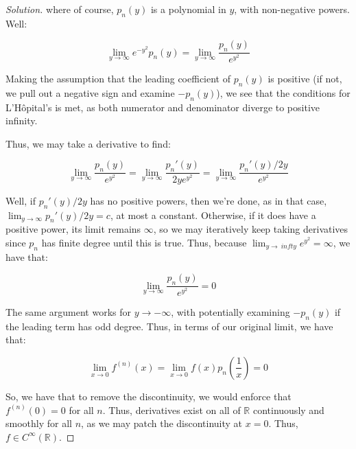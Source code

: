 \documentclass[10pt]{article}
\begin{document}
\begin{proof}[Solution]
where of course, $p_n(y)$ is a polynomial in $y$, with non-negative powers. Well:

$$\lim_{y \to \infty} e^{-y^2} p_n(y)  = \lim_{y \to \infty}\frac{p_n(y)}{e^{y^2}} $$

Making the assumption that the leading coefficient of $p_n(y)$ is positive (if not, we pull out a negative sign and examine $-p_n(y)$), we see that the conditions for L'H\^opital's is met, as both numerator and denominator diverge to positive infinity.

Thus, we may take a derivative to find:

$$  \lim_{y \to \infty}\frac{p_n(y)}{e^{y^2}} =  \lim_{y \to \infty}\frac{p_n'(y)}{2ye^{y^2}} =  \lim_{y \to \infty}\frac{p_n'(y)/2y}{e^{y^2}}$$  


Well, if $p_n'(y)/2y$ has no positive powers, then we're done, as in that case, $\lim_{y \to \infty} p_n'(y)/2y = c$, at most a constant. Otherwise, if it does have a positive power, its limit remains $\infty$, so we may iteratively keep taking derivatives since $p_n$ has finite degree until this is true. Thus, because $\lim_{y \to\ infty} e^{y^2} = \infty$, we have that:

$$ \lim_{y \to \infty}\frac{p_n(y)}{e^{y^2}}= 0$$

The same argument works for $y \to -\infty$, with potentially examining $-p_n(y)$ if the leading term has odd degree. Thus, in terms of our original limit, we have that:

$$\lim_{x\to 0} f^{(n)}(x) = \lim_{x\to 0} f(x) p_n\left( \frac{1}{x} \right) = 0$$

So, we have that to remove the discontinuity, we would enforce that $ f^{(n)}(0) = 0$ for all $n$. Thus, derivatives exist on all of $\mathbb{R}$ continuously and smoothly for all $n$, as we may patch the discontinuity at $x = 0$. Thus, $f \in C^\infty(\mathbb{R})$.





\end{proof}
\end{document}
